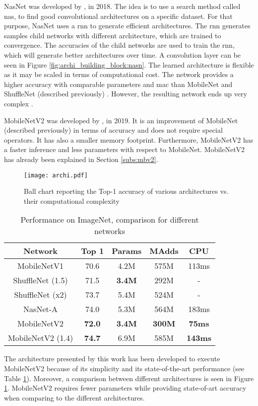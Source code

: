 NasNet was developed by \textcite{zoph_learning_2018}, in 2018. The idea is to use a search method called \acrfull{nas}, to find good convolutional architectures on a specific dataset. For that purpose, NasNet uses a \acrfull{rnn} to generate efficient architectures. The \acrshort{rnn} generates samples child networks with different architecture, which are trained to convergence. The accuracies of the child networks are used to train the \acrshort{rnn}, which will generate better architectures over time. A convolution layer can be seen in Figure \ref{fig:archi_building_block:nasn}. The learned architecture is flexible as it may be scaled in terms of computational cost. The network provides a higher accuracy with comparable parameters and \acrshort{mac} than MobileNet and ShuffleNet (described previously) \cite{zoph_learning_2018}. However, the resulting network ends up very complex \cite{sandler_mobilenetv2_2019}.

MobileNetV2 was developed by \textcite{sandler_mobilenetv2_2019}, in 2019. It is an improvement of MobileNet (described previously) in terms of accuracy and does not require special operators. It has also a smaller memory footprint. Furthermore, MobileNetV2 has a faster inference and less parameters with respect to MobileNet. MobileNetV2 has already been explained in Section \ref{subs:mbv2}.

\begin{figure}
    \centering
    \texttt{[image: archi.pdf]}
    \caption{Ball chart reporting the Top-1 accuracy of various architectures vs. their computational complexity \cite{canziani_analysis_2017}}
    \label{fig:archi}
\end{figure}
%
\begin{table}
    \center
    \begin{tabular}{ | c | c | c c | c| }
        \hline \hline
        Network & Top 1 & Params & MAdds & CPU \\
        \hline \hline
        MobileNetV1 & 70.6 & 4.2M & 575M & 113ms \\
        ShuffleNet (1.5) & 71.5 & \textbf{3.4M} & 292M & - \\
        ShuffleNet (x2)  & 73.7 & 5.4M & 524M & - \\
        NasNet-A & 74.0 & 5.3M & 564M & 183ms \\
        \hline
        MobileNetV2 & \textbf{72.0} & \textbf{3.4M} & \textbf{300M} & \textbf{75ms} \\
        MobileNetV2 (1.4) & \textbf{74.7} & 6.9M & 585M & \textbf{143ms} \\
        \hline \hline
    \end{tabular}
    \caption{Performance on ImageNet, comparison for different networks \cite{sandler_mobilenetv2_2019}}
    \label{tab:mbv2}
\end{table}
%
The architecture presented by this work has been developed to execute MobileNetV2 because of its simplicity and its state-of-the-art performance (see Table \ref{tab:mbv2}). Moreover, a comparison between different architectures is seen in Figure \ref{fig:archi}. MobileNetV2 requires fewer parameters while providing state-of-art accuracy when comparing to the different architectures.
%
